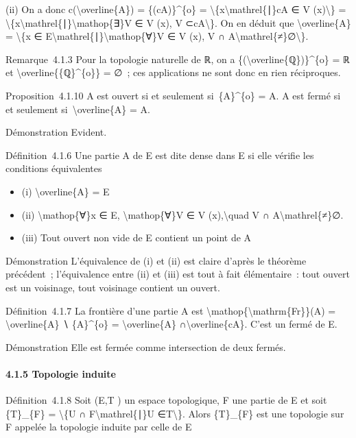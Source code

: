 \documentclass[]{article}
\begin{document}
(ii) On a donc c(\textbackslash{}overline\{A\}) = \{(cA)\}\^{}\{o\} =
\textbackslash{}\{x\textbackslash{}mathrel\{∣\}cA ∈ V
(x)\textbackslash{}\} =
\textbackslash{}\{x\textbackslash{}mathrel\{∣\}\textbackslash{}mathop\{∃\}V
∈ V (x), V ⊂cA\textbackslash{}\}. On en déduit que
\textbackslash{}overline\{A\} = \textbackslash{}\{x ∈
E\textbackslash{}mathrel\{∣\}\textbackslash{}mathop\{∀\}V ∈ V (x), V ∩
A\textbackslash{}mathrel\{≠\}∅\textbackslash{}\}.

Remarque~4.1.3 Pour la topologie naturelle de ℝ, on a
\{(\textbackslash{}overline\{ℚ\})\}\^{}\{o\} = ℝ et
\textbackslash{}overline\{\{ℚ\}\^{}\{o\}\} = ∅~; ces applications ne
sont donc en rien réciproques.

Proposition~4.1.10 A est ouvert si et seulement si~\{A\}\^{}\{o\} = A. A
est fermé si et seulement si~\textbackslash{}overline\{A\} = A.

Démonstration Evident.

Définition~4.1.6 Une partie A de E est dite dense dans E si elle vérifie
les conditions équivalentes

\begin{itemize}
\itemsep1pt\parskip0pt
\item
  (i) \textbackslash{}overline\{A\} = E
\item
  (ii) \textbackslash{}mathop\{∀\}x ∈ E, \textbackslash{}mathop\{∀\}V ∈
  V (x),\textbackslash{}quad V ∩ A\textbackslash{}mathrel\{≠\}∅.
\item
  (iii) Tout ouvert non vide de E contient un point de A
\end{itemize}

Démonstration L'équivalence de (i) et (ii) est claire d'après le
théorème précédent~; l'équivalence entre (ii) et (iii) est tout à fait
élémentaire~: tout ouvert est un voisinage, tout voisinage contient un
ouvert.

Définition~4.1.7 La frontière d'une partie A est
\textbackslash{}mathop\{\textbackslash{}mathrm\{Fr\}\}(A) =
\textbackslash{}overline\{A\} ∖ \{A\}\^{}\{o\} =
\textbackslash{}overline\{A\} ∩\textbackslash{}overline\{cA\}. C'est un
fermé de E.

Démonstration Elle est fermée comme intersection de deux fermés.

\paragraph{4.1.5 Topologie induite}

Définition~4.1.8 Soit (E,T ) un espace topologique, F une partie de E et
soit \{T\}\_\{F\} = \textbackslash{}\{U ∩ F\textbackslash{}mathrel\{∣\}U
∈T\textbackslash{}\}. Alors \{T\}\_\{F\} est une topologie sur F appelée
la topologie induite par celle de E
\end{document}
